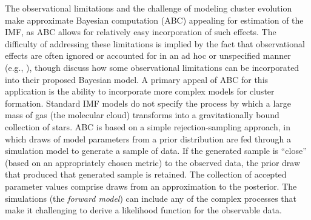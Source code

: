 \documentclass[ejs]{imsart}
\numberwithin{equation}{section}
\theoremstyle{plain}
\begin{document}
The observational limitations and the challenge of modeling cluster evolution make approximate Bayesian 
computation (ABC) appealing for estimation of the IMF, as ABC allows for relatively easy incorporation of
such effects. The difficulty of addressing these limitations is 
implied by the fact that observational effects are often ignored or accounted for in 
an ad hoc or unspecified manner (e.g., \citealt{DaRioEtAl2012, Ashworth2017, Jose2017, Kalari2018}), 
though \cite{weisz13} discuss how some observational limitations can be incorporated into their 
proposed Bayesian model.
A primary appeal of ABC for this application is the ability to incorporate more complex models for cluster
formation. 
Standard IMF models do not specify the process by which
a large mass of gas (the molecular cloud) transforms into a gravitationally bound collection of stars. 
ABC is based on a simple rejection-sampling approach, in which draws of model parameters from a prior 
distribution are fed through a simulation model to generate a sample of data. 
If the generated sample is ``close'' (based on an appropriately chosen metric) to the 
observed data, the prior draw that produced that generated sample is retained. The collection of
accepted parameter values comprise draws from an approximation to the posterior.
The simulations
(the \emph{forward model}) can include any of the complex processes that make it challenging to derive a
likelihood function for the observable data.
\end{document}
